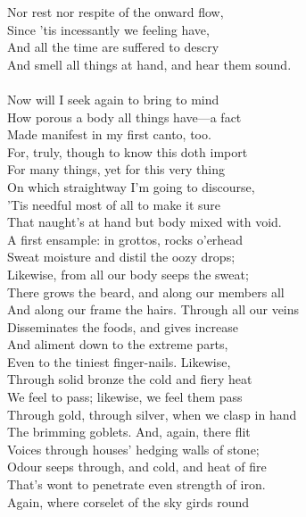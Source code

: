 Nor rest nor respite of the onward flow,\\
Since 'tis incessantly we feeling have,\\
And all the time are suffered to descry\\
And smell all things at hand, and hear them sound.\\
\\
Now will I seek again to bring to mind\\
How porous a body all things have—a fact\\
Made manifest in my first canto, too.\\
For, truly, though to know this doth import\\
For many things, yet for this very thing\\
On which straightway I'm going to discourse,\\
'Tis needful most of all to make it sure\\
That naught's at hand but body mixed with void.\\
A first ensample: in grottos, rocks o'erhead\\
Sweat moisture and distil the oozy drops;\\
Likewise, from all our body seeps the sweat;\\
There grows the beard, and along our members all\\
And along our frame the hairs. Through all our veins\\
Disseminates the foods, and gives increase\\
And aliment down to the extreme parts,\\
Even to the tiniest finger-nails. Likewise,\\
Through solid bronze the cold and fiery heat\\
We feel to pass; likewise, we feel them pass\\
Through gold, through silver, when we clasp in hand\\
The brimming goblets. And, again, there flit\\
Voices through houses' hedging walls of stone;\\
Odour seeps through, and cold, and heat of fire\\
That's wont to penetrate even strength of iron.\\
Again, where corselet of the sky girds round

